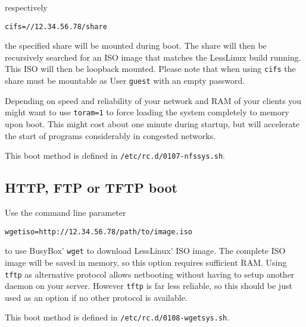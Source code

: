 respectively

\begin{verbatim}
cifs=//12.34.56.78/share
\end{verbatim}

the specified share will be mounted during boot. The share will then be recursively searched for an ISO image that matches the LessLinux build running. This ISO will then be loopback mounted. Please note that when using  \texttt{cifs} the share must be mountable as User \texttt{guest} with an empty password. 

Depending on speed and reliability of your network and RAM of your clients you might want to use \texttt{toram=1} to force loading the system completely to memory upon boot. This might cost about one minute during startup, but will accelerate the start of programs considerably in congested networks.

This boot method is defined in \texttt{/etc/rc.d/0107-nfssys.sh}.

\subsection{HTTP, FTP or TFTP boot}

Use the command line parameter 

\begin{verbatim}
wgetiso=http://12.34.56.78/path/to/image.iso
\end{verbatim}

to use BusyBox' \texttt{wget} to download LessLinux' ISO image. The complete ISO image will be saved in memory, so this option requires sufficient RAM. Using \texttt{tftp} as alternative protocol allows netbooting without having to setup another daemon on your server. However \texttt{tftp} is far less reliable, so this should be just used as an option if no other protocol is available. 

This boot method is defined in \texttt{/etc/rc.d/0108-wgetsys.sh}.





